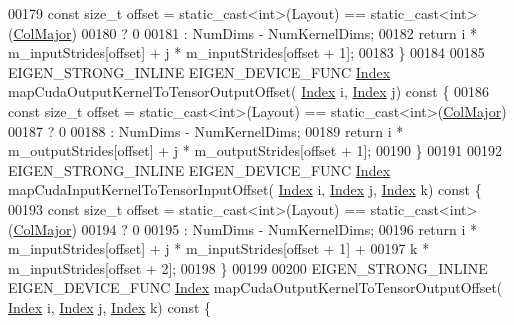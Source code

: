 \begin{DoxyCode}
00179     \textcolor{keyword}{const} \textcolor{keywordtype}{size\_t} offset = \textcolor{keyword}{static\_cast<}\textcolor{keywordtype}{int}\textcolor{keyword}{>}(Layout) == static\_cast<int>(\hyperlink{group__enums_ggaacded1a18ae58b0f554751f6cdf9eb13a0cbd4bdd0abcfc0224c5fcb5e4f6669a}{ColMajor})
00180                               ? 0
00181                               : NumDims - NumKernelDims;
00182     \textcolor{keywordflow}{return} i * m\_inputStrides[offset] + j * m\_inputStrides[offset + 1];
00183   \}
00184 
00185   EIGEN\_STRONG\_INLINE EIGEN\_DEVICE\_FUNC \hyperlink{namespace_eigen_a62e77e0933482dafde8fe197d9a2cfde}{Index} mapCudaOutputKernelToTensorOutputOffset(
      \hyperlink{namespace_eigen_a62e77e0933482dafde8fe197d9a2cfde}{Index} i, \hyperlink{namespace_eigen_a62e77e0933482dafde8fe197d9a2cfde}{Index} j)\textcolor{keyword}{ const }\{
00186     \textcolor{keyword}{const} \textcolor{keywordtype}{size\_t} offset = \textcolor{keyword}{static\_cast<}\textcolor{keywordtype}{int}\textcolor{keyword}{>}(Layout) == static\_cast<int>(\hyperlink{group__enums_ggaacded1a18ae58b0f554751f6cdf9eb13a0cbd4bdd0abcfc0224c5fcb5e4f6669a}{ColMajor})
00187                               ? 0
00188                               : NumDims - NumKernelDims;
00189     \textcolor{keywordflow}{return} i * m\_outputStrides[offset] + j * m\_outputStrides[offset + 1];
00190   \}
00191 
00192   EIGEN\_STRONG\_INLINE EIGEN\_DEVICE\_FUNC \hyperlink{namespace_eigen_a62e77e0933482dafde8fe197d9a2cfde}{Index} mapCudaInputKernelToTensorInputOffset(
      \hyperlink{namespace_eigen_a62e77e0933482dafde8fe197d9a2cfde}{Index} i, \hyperlink{namespace_eigen_a62e77e0933482dafde8fe197d9a2cfde}{Index} j, \hyperlink{namespace_eigen_a62e77e0933482dafde8fe197d9a2cfde}{Index} k)\textcolor{keyword}{ const }\{
00193     \textcolor{keyword}{const} \textcolor{keywordtype}{size\_t} offset = \textcolor{keyword}{static\_cast<}\textcolor{keywordtype}{int}\textcolor{keyword}{>}(Layout) == static\_cast<int>(\hyperlink{group__enums_ggaacded1a18ae58b0f554751f6cdf9eb13a0cbd4bdd0abcfc0224c5fcb5e4f6669a}{ColMajor})
00194                               ? 0
00195                               : NumDims - NumKernelDims;
00196     \textcolor{keywordflow}{return} i * m\_inputStrides[offset] + j * m\_inputStrides[offset + 1] +
00197            k * m\_inputStrides[offset + 2];
00198   \}
00199 
00200   EIGEN\_STRONG\_INLINE EIGEN\_DEVICE\_FUNC \hyperlink{namespace_eigen_a62e77e0933482dafde8fe197d9a2cfde}{Index} mapCudaOutputKernelToTensorOutputOffset(
      \hyperlink{namespace_eigen_a62e77e0933482dafde8fe197d9a2cfde}{Index} i, \hyperlink{namespace_eigen_a62e77e0933482dafde8fe197d9a2cfde}{Index} j, \hyperlink{namespace_eigen_a62e77e0933482dafde8fe197d9a2cfde}{Index} k)\textcolor{keyword}{ const }\{

\end{DoxyCode}
